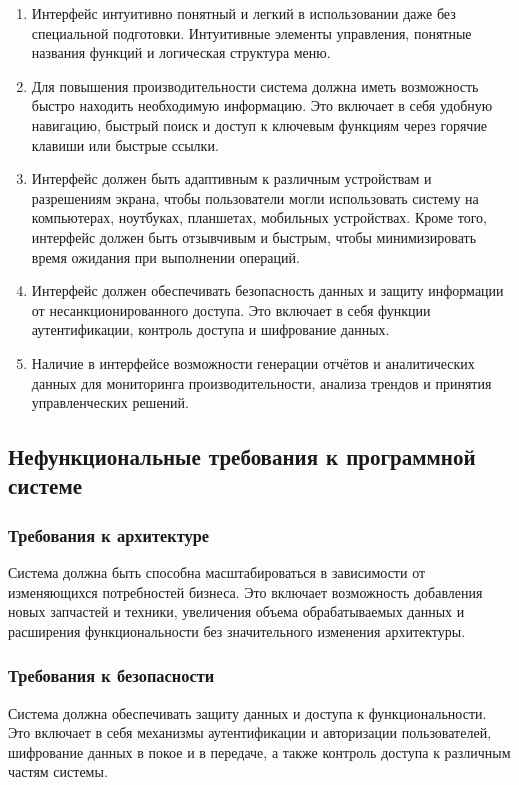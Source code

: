 \begin{enumerate}
	\item Интерфейс интуитивно понятный и легкий в использовании даже без специальной подготовки. Интуитивные элементы управления, понятные названия функций и логическая структура меню.
	\item Для повышения производительности система должна иметь возможность быстро находить необходимую информацию. Это включает в себя удобную навигацию, быстрый поиск и доступ к ключевым функциям через горячие клавиши или быстрые ссылки.
	\item Интерфейс должен быть адаптивным к различным устройствам и разрешениям экрана, чтобы пользователи могли использовать систему на компьютерах, ноутбуках, планшетах, мобильных устройствах. Кроме того, интерфейс должен быть отзывчивым и быстрым, чтобы минимизировать время ожидания при выполнении операций.
	\item Интерфейс должен обеспечивать безопасность данных и защиту информации от несанкционированного доступа. Это включает в себя функции аутентификации, контроль доступа и шифрование данных.
	\item Наличие в интерфейсе возможности генерации отчётов и аналитических данных для мониторинга производительности, анализа трендов и принятия управленческих решений.
\end{enumerate}

\subsection{Нефункциональные требования к программной системе}
\subsubsection{Требования к архитектуре}
Система должна быть способна масштабироваться в зависимости от изменяющихся потребностей бизнеса. Это включает возможность добавления новых запчастей и техники, увеличения объема обрабатываемых данных и расширения функциональности без значительного изменения архитектуры.


\subsubsection{Требования к безопасности}

Система должна обеспечивать защиту данных и доступа к функциональности. Это включает в себя механизмы аутентификации и авторизации пользователей, шифрование данных в покое и в передаче, а также контроль доступа к различным частям системы.

